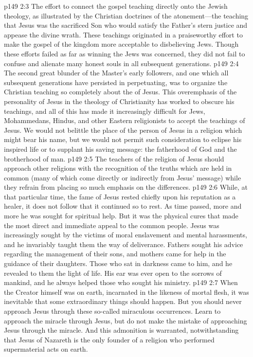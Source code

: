 \pc \vs p149 2:3 \bibnobreakspace The effort to connect the gospel teaching directly onto the Jewish theology, as illustrated by the Christian doctrines of the atonement---the teaching that Jesus was the sacrificed Son who would satisfy the Father’s stern justice and appease the divine wrath. These teachings originated in a praiseworthy effort to make the gospel of the kingdom more acceptable to disbelieving Jews. Though these efforts failed as far as winning the Jews was concerned, they did not fail to confuse and alienate many honest souls in all subsequent generations.
\pc \vs p149 2:4 \bibnobreakspace The second great blunder of the Master’s early followers, and one which all subsequent generations have persisted in perpetuating, was to organize the Christian teaching so completely about the  of Jesus. This overemphasis of the personality of Jesus in the theology of Christianity has worked to obscure his teachings, and all of this has made it increasingly difficult for Jews, Mohammedans, Hindus, and other Eastern religionists to accept the teachings of Jesus. We would not belittle the place of the person of Jesus in a religion which might bear his name, but we would not permit such consideration to eclipse his inspired life or to supplant his saving message: the fatherhood of God and the brotherhood of man.
\pc \vs p149 2:5 The teachers of the religion of Jesus should approach other religions with the recognition of the truths which are held in common (many of which come directly or indirectly from Jesus’ message) while they refrain from placing so much emphasis on the differences.
\pc \vs p149 2:6 While, at that particular time, the fame of Jesus rested chiefly upon his reputation as a healer, it does not follow that it continued so to rest. As time passed, more and more he was sought for spiritual help. But it was the physical cures that made the most direct and immediate appeal to the common people. Jesus was increasingly sought by the victims of moral enslavement and mental harassments, and he invariably taught them the way of deliverance. Fathers sought his advice regarding the management of their sons, and mothers came for help in the guidance of their daughters. Those who sat in darkness came to him, and he revealed to them the light of life. His ear was ever open to the sorrows of mankind, and he always helped those who sought his ministry.
\vs p149 2:7 When the Creator himself was on earth, incarnated in the likeness of mortal flesh, it was inevitable that some extraordinary things should happen. But you should never approach Jesus through these so\hyp{}called miraculous occurrences. Learn to approach the miracle through Jesus, but do not make the mistake of approaching Jesus through the miracle. And this admonition is warranted, notwithstanding that Jesus of Nazareth is the only founder of a religion who performed supermaterial acts on earth.
